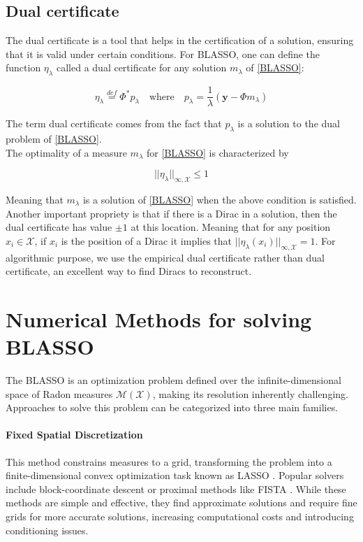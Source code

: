 \documentclass[a4paper,12pt,oneside]{report}
\theoremstyle{named}
\begin{document}
\subsection{Dual certificate} \label{dual_cert}
The dual certificate is a tool that helps in the certification of a solution, ensuring that it is valid under certain conditions. For BLASSO, one can define the function $\eta_{\lambda}$ called a dual certificate \cite{Denoyelle_2020, Duval2014} for any solution $m_{\lambda}$ of \eqref{BLASSO}:

\begin{equation}
    \eta_{\lambda} \stackrel{def}{=}  \Phi^{*}p_{\lambda} \quad \text{where} \quad p_{\lambda} = \frac{1}{\lambda} (\mathbf{y} - \Phi m_{\lambda})
     \label{dual-certificate}
\end{equation}

The term dual certificate comes from the fact that $p_{\lambda}$ is a solution to the dual problem of \eqref{BLASSO}. \\

The optimality of a measure $m_{\lambda}$ for \eqref{BLASSO} is characterized by

\begin{equation}
    ||\eta_{\lambda}||_{\infty, \mathcal{X}} \leq 1
\end{equation}

Meaning that $m_{\lambda}$ is a solution of \eqref{BLASSO} when the above condition is satisfied. Another important propriety is that if there is a Dirac in a solution, then the dual certificate has value $\pm 1$ at this location. Meaning that for any position $x_i \in \mathcal{X}$, if $x_i$ is the position of a Dirac it implies that $||\eta_{\lambda}(x_i)||_{\infty, \mathcal{X}} = 1$. For algorithmic purpose, we use the empirical dual certificate rather than dual certificate, an excellent way to find Diracs to reconstruct.

\section{Numerical Methods for solving BLASSO}
The BLASSO is an optimization problem defined over the infinite-dimensional space of Radon measures $\mathcal{M}(\mathcal{X})$, making its resolution inherently challenging. Approaches to solve this problem can be categorized into three main families.

\paragraph{Fixed Spatial Discretization}
This method constrains measures to a grid, transforming the problem into a finite-dimensional convex optimization task known as LASSO \cite{Tibshirani1996}. Popular solvers include block-coordinate descent \cite{Wu_2008} or proximal methods like FISTA \cite{doi:10.1137/080716542}. While these methods are simple and effective, they find approximate solutions and require fine grids for more accurate solutions, increasing computational costs and introducing conditioning issues.
\end{document}
